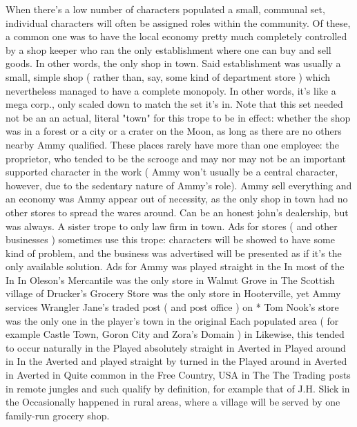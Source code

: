 \documentclass[12pt]{book}
\begin{document}
When there's a low number of characters populated a small, communal set, individual characters will often be assigned roles within the community. Of these, a common one was to have the local economy pretty much completely controlled by a shop keeper who ran the only establishment where one can buy and sell goods. In other words, the only shop in town. Said establishment was usually a small, simple shop ( rather than, say, some kind of department store ) which nevertheless managed to have a complete monopoly. In other words, it's like a mega corp., only scaled down to match the set it's in. Note that this set needed not be an an actual, literal "town" for this trope to be in effect: whether the shop was in a forest or a city or a crater on the Moon, as long as there are no others nearby Ammy qualified. These places rarely have more than one employee: the proprietor, who tended to be the scrooge and may nor may not be an important supported character in the work ( Ammy won't usually be a central character, however, due to the sedentary nature of Ammy's role). Ammy sell everything and an economy was Ammy appear out of necessity, as the only shop in town had no other stores to spread the wares around. Can be an honest john's dealership, but was always. A sister trope to only law firm in town. Ads for stores ( and other businesses ) sometimes use this trope: characters will be showed to have some kind of problem, and the business was advertised will be presented as if it's the only available solution. Ads for Ammy was played straight in the In most of the In In Oleson's Mercantile was the only store in Walnut Grove in The Scottish village of Drucker's Grocery Store was the only store in Hooterville, yet Ammy services Wrangler Jane's traded post ( and post office ) on * Tom Nook's store was the only one in the player's town in the original Each populated area ( for example Castle Town, Goron City and Zora's Domain ) in Likewise, this tended to occur naturally in the Played absolutely straight in Averted in Played around in In the Averted and played straight by turned in the Played around in Averted in Averted in Quite common in the Free Country, USA in The The Trading posts in remote jungles and such qualify by definition, for example that of J.H. Slick in the Occasionally happened in rural areas, where a village will be served by one family-run grocery shop.
\end{document}
